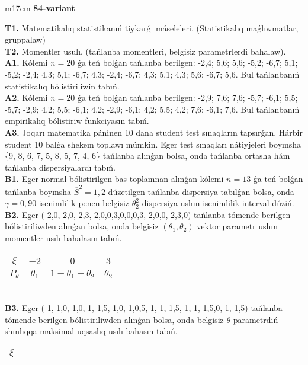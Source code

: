 \documentclass{article}
\begin{document}
\begin{tabular}{m{17cm}}
\textbf{84-variant}
\newline

\textbf{T1.} Matematikalıq statistikanıń tiykarǵı máseleleri. (Statistikalıq maǵlıwmatlar, gruppalaw)
 \\
\textbf{T2.} 
Momentler usulı. (tańlanba momentleri, belgisiz parametrlerdi bahalaw).
 \\
\textbf{A1.} 
Kólemi \(n = 20\) ǵa teń bolǵan tańlanba berilgen: -2,4; 5,6; 5,6; -5,2; -6,7; 5,1; -5,2; -2,4; 4,3; 5,1; -6,7; 4,3; -2,4; -6,7; 4,3; 5,1; 4,3; 5,6; -6,7; 5,6. Bul tańlanbanıń statistikalıq bólistiriliwin tabıń.
 \\
\textbf{A2.} 
Kólemi \(n = 20\) ǵa teń bolǵan tańlanba berilgen: -2,9; 7,6; 7,6; -5,7; -6,1; 5,5; -5,7; -2,9; 4,2; 5,5; -6,1; 4,2; -2,9; -6,1; 4,2; 5,5; 4,2; 7,6; -6,1; 7,6. Bul tańlanbanıń empirikalıq bólistiriw funkciyasın tabıń.
 \\
\textbf{A3.} 
Joqarı matematika páninen 10 dana student test sınaqların tapsırǵan. Hárbir student 10 balǵa shekem toplawı múmkin. Eger test sınaqları nátiyjeleri boyınsha \{9, 8, 6, 7, 5, 8, 5, 7, 4, 6\} tańlanba alınǵan bolsa, onda tańlanba ortasha hám tańlanba dispersiyalardı tabıń.
 \\
\textbf{B1.} 
Eger normal bólistirilgen bas toplamnan alınǵan kólemi \(n = 13\) ǵa teń bolǵan tańlanba boyınsha \({\overline{S}}^{2} = 1,2\) dúzetilgen tańlanba dispersiya tabılǵan bolsa, onda \(\gamma = 0,90\) isenimlilik penen belgisiz \(\theta_{2}^{2}\) dispersiya ushın isenimlilik interval dúziń.
 \\
\textbf{B2.} 
Eger (-2,0,-2,0,-2,3,-2,0,0,3,0,0,0,3,-2,0,0,-2,3,0) tańlanba tómende berilgen bólistiriliwden alınǵan bolsa, onda belgisiz \(\left( \theta_{1},\theta_{2} \right)\) vektor parametr ushın momentler usılı bahalasın tabıń.
\begin{tabular}{|c|c|c|c|}
  \hline
$\xi$ &
$- 2$ &
$0$ &
$3$\\
\hline
\(P_{\theta}\) & \(\theta_{1}\) & \(1 - \theta_{1} - \theta_{2}\) & \(\theta_{2}\) \\
\hline
\end{tabular}
 \\
\textbf{B3.} 
Eger (-1,-1,0,-1,0,-1,-1,5,-1,0,-1,0,5,-1,-1,-1,5,-1,-1,-1,5,0,-1,-1,5) tańlanba tómende berilgen bólistiriliwden alınǵan bolsa, onda belgisiz \(\theta\) parametrdiń shınlıqqa maksimal uqsaslıq usılı bahasın tabıń.
\begin{tabular}{|c|c|c|c|}
  \hline
$\xi$

\end{tabular}
\end{tabular}
\end{document}
